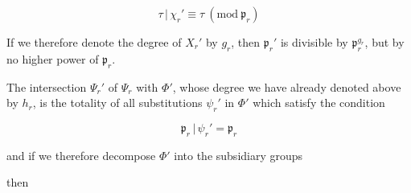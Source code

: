\[
\tau\,|\,\chi_r' \equiv \tau \ (\mathrm{mod}\ \mathfrak{p}_r)
\]

If we therefore denote the degree of $X_r'$ by $g_r$, then
$\mathfrak{p}_r'$ is divisible by $\mathfrak{p}_r^{g_r}$, but by no higher power of $\mathfrak{p}_r$.

The intersection $\Psi_r'$ of $\Psi_r$ with $\Phi'$, whose degree we have
already denoted above by $h_r$, is the totality of all substitutions
$\psi_r'$ in $\Phi'$ which satisfy the condition

\[
\mathfrak{p}_r\,|\,\psi_r' = \mathfrak{p}_r
\]

and if we therefore decompose $\Phi'$ into the subsidiary groups


then

